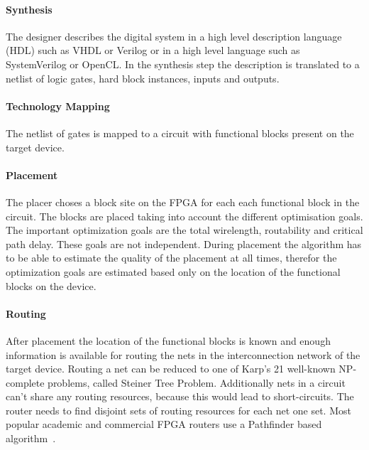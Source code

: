 \documentclass[a4paper,oneside,12pt]{article}
\begin{document}
\paragraph{Synthesis}
The designer describes the digital system in a high level description language (HDL) such as VHDL or Verilog or in a high level language such as SystemVerilog or OpenCL. In the synthesis step the description is translated to a netlist of logic gates, hard block instances, inputs and outputs.

\paragraph{Technology Mapping} 
The netlist of gates is mapped to a circuit with functional blocks present on the target device.

\paragraph{Placement}
The placer choses a block site on the FPGA for each each functional block in the circuit. The blocks are placed taking into account the different optimisation goals. The important optimization goals are the total wirelength, routability and critical path delay. These goals are not independent. During placement the algorithm has to be able to estimate the quality of the placement at all times, therefor the optimization goals are estimated based only on the location of the functional blocks on the device. 

\paragraph{Routing} After placement the location of the functional blocks is known and enough information is available for routing the nets in the interconnection network of the target device. Routing a net can be reduced to  one of Karp's 21 well-known NP-complete problems, called Steiner Tree Problem. Additionally nets in a circuit can't share any routing resources, because this would lead to short-circuits. The router needs to find disjoint sets of routing resources for each net one set. Most popular academic and commercial FPGA routers use a Pathfinder based algorithm~\cite{pathfinder, vprBVRJ, vprboek}.
\end{document}
